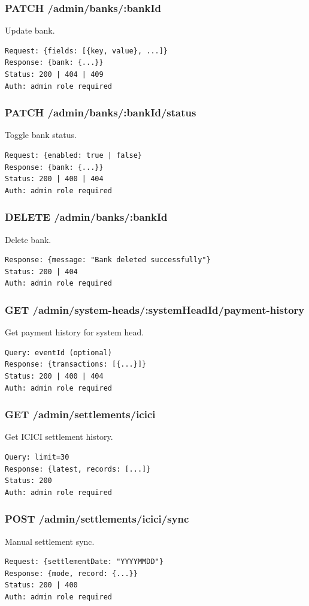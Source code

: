\documentclass[12pt,a4paper]{article}
\begin{document}
\subsubsection{PATCH /admin/banks/:bankId}
Update bank.
\begin{lstlisting}
Request: {fields: [{key, value}, ...]}
Response: {bank: {...}}
Status: 200 | 404 | 409
Auth: admin role required
\end{lstlisting}

\subsubsection{PATCH /admin/banks/:bankId/status}
Toggle bank status.
\begin{lstlisting}
Request: {enabled: true | false}
Response: {bank: {...}}
Status: 200 | 400 | 404
Auth: admin role required
\end{lstlisting}

\subsubsection{DELETE /admin/banks/:bankId}
Delete bank.
\begin{lstlisting}
Response: {message: "Bank deleted successfully"}
Status: 200 | 404
Auth: admin role required
\end{lstlisting}

\subsubsection{GET /admin/system-heads/:systemHeadId/payment-history}
Get payment history for system head.
\begin{lstlisting}
Query: eventId (optional)
Response: {transactions: [{...}]}
Status: 200 | 400 | 404
Auth: admin role required
\end{lstlisting}

\subsubsection{GET /admin/settlements/icici}
Get ICICI settlement history.
\begin{lstlisting}
Query: limit=30
Response: {latest, records: [...]}
Status: 200
Auth: admin role required
\end{lstlisting}

\subsubsection{POST /admin/settlements/icici/sync}
Manual settlement sync.
\begin{lstlisting}
Request: {settlementDate: "YYYYMMDD"}
Response: {mode, record: {...}}
Status: 200 | 400
Auth: admin role required
\end{lstlisting}
\end{document}
